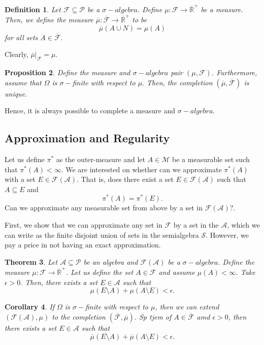 \documentclass[twoside]{article}
\newcounter{lecnum}
\newtheorem{theorem}{Theorem}[lecnum]
\newtheorem{proposition}[theorem]{Proposition}
\newtheorem{corollary}[theorem]{Corollary}
\newtheorem{definition}[theorem]{Definition}
\newcommand{\algebra}{\mathcal{A}}
\newcommand{\semialgebra}{\mathcal{S}}
\newcommand{\sigmalgebra}{\mathcal{F}}
\newcommand{\sa}{\sigma-algebra}
\newcommand{\powerset}{\mathcal{P}}
\newcommand{\positiveextendedreal}{\overline{\mathbb{R}}^+}
\begin{document}
\begin{definition}Let $\sigmalgebra \subseteq \powerset$ be a $\sa.$ Define $\mu: \sigmalgebra \rightarrow \positiveextendedreal$ be a measure. Then, we define the measure $\overline{\mu}: \overline{\sigmalgebra} \rightarrow \positiveextendedreal$ to be 
$$
\overline{\mu}(A \cup N) = \mu(A)
$$
for all sets $A \in \overline{\sigmalgebra}.$
\end{definition}

Clearly, $\overline{\mu}|_{\sigmalgebra} = \mu.$

\begin{proposition}Define the measure and $\sa$ pair $(\mu, \sigmalgebra)$. Furthermore, assume that $\Omega$ is $\sigma-$finite with respect to $\mu.$ Then, the completion $(\overline{\mu}, \overline{\sigmalgebra})$ is unique.
\end{proposition}

Hence, it is always possible to complete a measure and $\sa.$

\subsection{Approximation and Regularity}

Let us define $\pi^*$ as the outer-measure and let $A \in \mathcal{M}$ be a measurable set such that $\pi^*(A) < \infty.$ We are interested on whether can we approximate $\pi^*(A)$ with a set $E \in \sigmalgebra(\algebra).$ That is, does there exist a set $E \in \sigmalgebra(\algebra)$ such that $A \subseteq E$ and 
$$
\pi^*(A) = \pi^*(E).
$$
Can we approximate any measurable set from above by a set in $\sigmalgebra(\algebra)?$.

First, we show that we can approximate any set in $\sigmalgebra$ by a set in the $\algebra$, which we can write as the finite disjoint union of sets in the semialgebra $\semialgebra$. However, we pay a price in not having an exact approximation.
\begin{theorem}Let $\algebra \subseteq \powerset$ be an algebra and $\sigmalgebra(\algebra)$ be a $\sa.$ Define the measure $\mu: \sigmalgebra \rightarrow \positiveextendedreal$. Let us define the set $A \in \sigmalgebra$ and assume $\mu(A) < \infty.$ Take $\epsilon > 0.$ Then, there exists a set $E \in \algebra$ such that 
$$
\mu(E \text{\textbackslash} A) + \mu(A \text{\textbackslash} E) < \epsilon.
$$
\end{theorem}

\begin{corollary}If $\Omega$ is $\sigma-$finite with respect to $\mu$, then we can extend $(\sigmalgebra(\algebra), \mu)$ to the completion $(\overline{\sigmalgebra}, \overline{\mu})$. Sp tjem of $A \in \overline{\sigmalgebra}$ amd $\epsilon > 0$, then there exists a set $E \in \algebra$ such that 
$$
\overline{\mu}(E \text{\textbackslash} A) + \overline{\mu}(A \text{\textbackslash} E) < \epsilon.
$$
\end{corollary}
\end{document}
